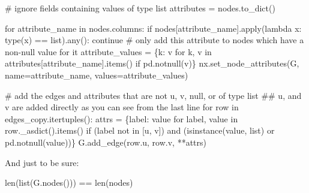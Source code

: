 \documentclass[
  letterpaper,
  DIV=11,
  numbers=noendperiod]{scrreprt}
\newenvironment{Shaded}{\begin{snugshade}}{\end{snugshade}}
\newcommand{\BuiltInTok}[1]{\textcolor[rgb]{0.00,0.23,0.31}{#1}}
\newcommand{\CommentTok}[1]{\textcolor[rgb]{0.37,0.37,0.37}{#1}}
\newcommand{\ControlFlowTok}[1]{\textcolor[rgb]{0.00,0.23,0.31}{#1}}
\newcommand{\KeywordTok}[1]{\textcolor[rgb]{0.00,0.23,0.31}{#1}}
\newcommand{\NormalTok}[1]{\textcolor[rgb]{0.00,0.23,0.31}{#1}}
\newcommand{\OperatorTok}[1]{\textcolor[rgb]{0.37,0.37,0.37}{#1}}
\newcommand{\StringTok}[1]{\textcolor[rgb]{0.13,0.47,0.30}{#1}}
\begin{document}
\begin{Shaded}
\begin{Highlighting}[]
\CommentTok{\# ignore fields containing values of type list}
\NormalTok{attributes }\OperatorTok{=}\NormalTok{ nodes.to\_dict()}

\ControlFlowTok{for}\NormalTok{ attribute\_name }\KeywordTok{in}\NormalTok{ nodes.columns:}
    \ControlFlowTok{if}\NormalTok{ nodes[attribute\_name].}\BuiltInTok{apply}\NormalTok{(}\KeywordTok{lambda}\NormalTok{ x: }\BuiltInTok{type}\NormalTok{(x) }\OperatorTok{==} \BuiltInTok{list}\NormalTok{).}\BuiltInTok{any}\NormalTok{(): }
        \ControlFlowTok{continue}    
    \CommentTok{\# only add this attribute to nodes which have a non{-}null value for it}
\NormalTok{    attribute\_values }\OperatorTok{=}\NormalTok{ \{k: v }\ControlFlowTok{for}\NormalTok{ k, v }\KeywordTok{in}\NormalTok{ attributes[attribute\_name].items() }\ControlFlowTok{if}\NormalTok{ pd.notnull(v)\}}
\NormalTok{    nx.set\_node\_attributes(G, name}\OperatorTok{=}\NormalTok{attribute\_name, values}\OperatorTok{=}\NormalTok{attribute\_values)}

\CommentTok{\# add the edges and attributes that are not u, v, null, or of type list}
\CommentTok{\#\# u, and v are added directly as you can see from the last line}
\ControlFlowTok{for}\NormalTok{ row }\KeywordTok{in}\NormalTok{ edges\_copy.itertuples():}
\NormalTok{    attrs }\OperatorTok{=}\NormalTok{ \{label: value }\ControlFlowTok{for}\NormalTok{ label, value }\KeywordTok{in}\NormalTok{ row.\_asdict().items() }\ControlFlowTok{if}\NormalTok{ (label }\KeywordTok{not} \KeywordTok{in}\NormalTok{ [}\StringTok{\textquotesingle{}u\textquotesingle{}}\NormalTok{, }\StringTok{\textquotesingle{}v\textquotesingle{}}\NormalTok{]) }\KeywordTok{and}\NormalTok{ (}\BuiltInTok{isinstance}\NormalTok{(value, }\BuiltInTok{list}\NormalTok{) }\KeywordTok{or}\NormalTok{ pd.notnull(value))\}}
\NormalTok{    G.add\_edge(row.u, row.v, }\OperatorTok{**}\NormalTok{attrs)}
\end{Highlighting}
\end{Shaded}

And just to be sure:

\begin{Shaded}
\begin{Highlighting}[]
\BuiltInTok{len}\NormalTok{(}\BuiltInTok{list}\NormalTok{(G.nodes())) }\OperatorTok{==} \BuiltInTok{len}\NormalTok{(nodes)}
\end{Highlighting}
\end{Shaded}
\end{document}
